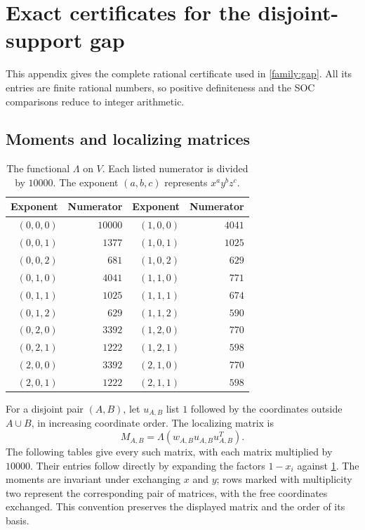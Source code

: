 \section{Exact certificates for the disjoint-support gap}
\label{family:appendix}

This appendix gives the complete rational certificate used in
\cref{family:gap}. All its entries are finite rational numbers, so
positive definiteness and the SOC comparisons reduce to integer arithmetic.

\subsection{Moments and localizing matrices}

\begin{table}[htbp]
\centering
\caption{The functional $\Lambda$ on $V$. Each listed numerator is divided
by $10000$. The exponent $(a,b,c)$ represents $x^ay^bz^c$.}
\label{family:moment-table}
\begin{tabular}{rrrr}
\toprule
Exponent & Numerator & Exponent & Numerator\\
\midrule
$(0,0,0)$ & $10000$ & $(1,0,0)$ & $4041$\\
$(0,0,1)$ & $1377$  & $(1,0,1)$ & $1025$\\
$(0,0,2)$ & $681$   & $(1,0,2)$ & $629$\\
$(0,1,0)$ & $4041$  & $(1,1,0)$ & $771$\\
$(0,1,1)$ & $1025$  & $(1,1,1)$ & $674$\\
$(0,1,2)$ & $629$   & $(1,1,2)$ & $590$\\
$(0,2,0)$ & $3392$  & $(1,2,0)$ & $770$\\
$(0,2,1)$ & $1222$  & $(1,2,1)$ & $598$\\
$(2,0,0)$ & $3392$  & $(2,1,0)$ & $770$\\
$(2,0,1)$ & $1222$  & $(2,1,1)$ & $598$\\
\bottomrule
\end{tabular}
\end{table}

For a disjoint pair $(A,B)$, let $u_{A,B}$ list $1$ followed by the
coordinates outside $A\cup B$, in increasing coordinate order. The
localizing matrix is
\[
M_{A,B}=\Lambda(w_{A,B}u_{A,B}u_{A,B}^T).
\]
The following tables give every such matrix, with each matrix multiplied
by $10000$. Their entries follow directly by expanding the factors
$1-x_i$ against \cref{family:moment-table}.
The moments are invariant under exchanging $x$ and $y$; rows marked with
multiplicity two represent the corresponding pair of matrices, with the
free coordinates exchanged. This convention preserves the displayed
matrix and the order of its basis.

